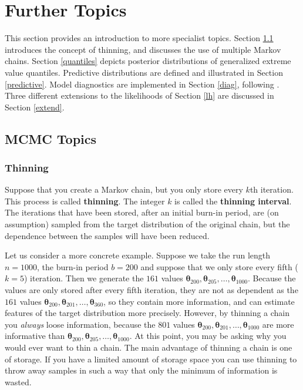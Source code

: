 \documentclass[11pt,a4paper]{article}
\newcommand{\bs}{\boldsymbol}
\begin{document}
\section{Further Topics}
\setcounter{footnote}{0}
\label{further}

This section provides an introduction to more specialist topics.
Section \ref{mcmc} introduces the concept of thinning, and discusses
the use of multiple Markov chains.  Section \ref{quantiles} depicts
posterior distributions of generalized extreme value quantiles.
Predictive distributions are defined and illustrated in Section
\ref{predictive}.  Model diagnostics are implemented in Section
\ref{diag}, following \citet{gelmcarl95}.  Three different extensions
to the likelihoods of Section \ref{lh} are discussed in Section
\ref{extend}.

\subsection{MCMC Topics}
\label{mcmc}

\subsubsection{Thinning}
\label{thin}

Suppose that you create a Markov chain, but you only store every $k$th
iteration.  This process is called \textbf{thinning}.  The integer $k$
is called the \textbf{thinning interval}.  The iterations that have
been stored, after an initial burn-in period, are (on assumption)
sampled from the target distribution of the original chain, but the
dependence between the samples will have been reduced.

Let us consider a more concrete example.  Suppose we take the run
length $n=1000$, the burn-in period $b=200$ and suppose that we only
store every fifth ($k=5$) iteration.  Then we generate the $161$
values $\bs{\theta}_{200},\bs{\theta}_{205},\dots,\bs{\theta}_{1000}$.
Because the values are only stored after every fifth iteration, they
are not as dependent as the $161$ values
$\bs{\theta}_{200},\bs{\theta}_{201},\dots,\bs{\theta}_{360}$, so they
contain more information, and can estimate features of the target
distribution more precisely.  However, by thinning a chain you
\emph{always} loose information, because the $801$ values
$\bs{\theta}_{200},\bs{\theta}_{201},\dots,\bs{\theta}_{1000}$ are
more informative than
$\bs{\theta}_{200},\bs{\theta}_{205},\dots,\bs{\theta}_{1000}$.  At
this point, you may be asking why you would ever want to thin a chain.
The main advantage of thinning a chain is one of storage.  If you have
a limited amount of storage space you can use thinning to throw away
samples in such a way that only the minimum of information is wasted.
\end{document}
